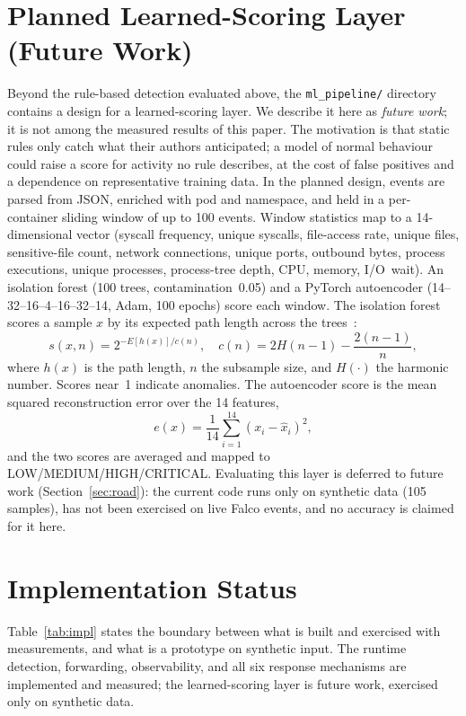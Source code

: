 \documentclass[10pt,conference]{IEEEtran}
\begin{document}
\section{Planned Learned-Scoring Layer (Future Work)}\label{sec:ml}
Beyond the rule-based detection evaluated above, the \texttt{ml\_pipeline/} directory contains a design for a learned-scoring layer. We describe it here as \emph{future work}; it is not among the measured results of this paper. The motivation is that static rules only catch what their authors anticipated; a model of normal behaviour could raise a score for activity no rule describes, at the cost of false positives and a dependence on representative training data. In the planned design, events are parsed from JSON, enriched with pod and namespace, and held in a per-container sliding window of up to 100 events. Window statistics map to a 14-dimensional vector (syscall frequency, unique syscalls, file-access rate, unique files, sensitive-file count, network connections, unique ports, outbound bytes, process executions, unique processes, process-tree depth, CPU, memory, I/O~wait). An isolation forest (100 trees, contamination~0.05) and a PyTorch autoencoder (14--32--16--4--16--32--14, Adam, 100 epochs) score each window. The isolation forest scores a sample $x$ by its expected path length across the trees~\cite{iforest}:
\begin{equation}
s(x,n)=2^{-E[h(x)]/c(n)},\quad c(n)=2H(n-1)-\frac{2(n-1)}{n},
\end{equation}
where $h(x)$ is the path length, $n$ the subsample size, and $H(\cdot)$ the harmonic number. Scores near~1 indicate anomalies. The autoencoder score is the mean squared reconstruction error over the 14 features,
\begin{equation}
e(x)=\frac{1}{14}\sum_{i=1}^{14}\left(x_i-\hat{x}_i\right)^2 ,
\end{equation}
and the two scores are averaged and mapped to LOW/MEDIUM/HIGH/CRITICAL. Evaluating this layer is deferred to future work (Section~\ref{sec:road}): the current code runs only on synthetic data (105 samples), has not been exercised on live Falco events, and no accuracy is claimed for it here.

\section{Implementation Status}\label{sec:status}
Table~\ref{tab:impl} states the boundary between what is built and exercised with measurements, and what is a prototype on synthetic input. The runtime detection, forwarding, observability, and all six response mechanisms are implemented and measured; the learned-scoring layer is future work, exercised only on synthetic data.
\end{document}
